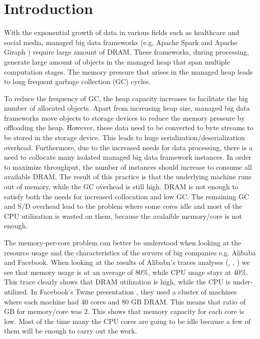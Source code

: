 \section{Introduction}
\label{sec:intro}

With the exponential growth of data in various fields such as
healthcare and social media, managed big data frameworks (e.g, Apache Spark \cite{Spark} and
Apache Giraph \cite{Giraph}) require large amount of DRAM. 
These frameworks, during processing, generate large amount of objects
in the managed heap that span multiple computation stages.
The memory pressure that arises in the managed heap leads to long frequent garbage
collection (GC) cycles.

To reduce the frequency of GC, the heap capacity increases to
facilitate the big number of allocated objects. Apart from
increasing heap size, managed big data frameworks move objects to
storage devices to reduce the memory pressure by offloading the heap. 
However, these data need to be converted to byte streams to be stored in the storage device.
This leads to huge serialization/deserialization overhead.
Furthermore, due to the increased needs for data processing, there is a need to collocate
many isolated managed big data framework instances. In order to maximize throughput,
the number of instances should increase to consume all available DRAM.
The result of this practice is that the underlying machine runs out of
memory, while the GC overhead is still high. DRAM is not enough to satisfy both the needs
for increased collocation and low GC.
The remaining GC and S/D overhead lead to the problem where some cores idle and most of the CPU utilization is wasted
on them, because the avalaible memory/core is not enough.

The memory-per-core problem can better be understood when looking at
the resource usage and the characteristics of the servers of big
companies e.g. Alibaba and Facebook. When looking at the results of
Alibaba's traces analyses (\cite{Alibaba}, \cite{Alibaba1}, \cite{Alibabacolocated}) we see that memory usage is at
an average of 80\%, while CPU usage stays at 40\%. This trace clearly
shows that DRAM utilization is high, while the CPU is under-utilized.
In Facebook's Twine presentation \cite{Twine}, they used a cluster of
machines where each machine had 40 cores and 80 GB DRAM. This means
that ratio of GB for memory/core was 2. This shows that memory capacity for each core is low. Most of the time many the CPU cores are going to be idle
because a few of them will be enough to carry out the work.

